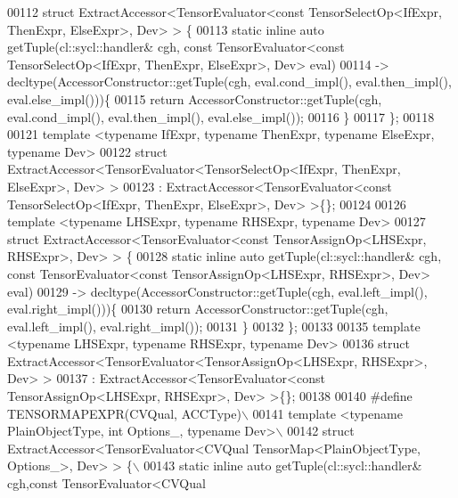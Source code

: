 \begin{DoxyCode}
00112 \textcolor{keyword}{struct }ExtractAccessor<TensorEvaluator<const TensorSelectOp<IfExpr, ThenExpr, ElseExpr>, Dev> > \{
00113   \textcolor{keyword}{static} \textcolor{keyword}{inline} \textcolor{keyword}{auto} getTuple(cl::sycl::handler& cgh, \textcolor{keyword}{const} TensorEvaluator<\textcolor{keyword}{const} TensorSelectOp<IfExpr,
       ThenExpr, ElseExpr>, Dev> eval)
00114   -> decltype(AccessorConstructor::getTuple(cgh, eval.cond\_impl(), eval.then\_impl(), eval.else\_impl()))\{
00115     \textcolor{keywordflow}{return} AccessorConstructor::getTuple(cgh, eval.cond\_impl(), eval.then\_impl(), eval.else\_impl());
00116   \}
00117 \};
00118 
00121 \textcolor{keyword}{template} <\textcolor{keyword}{typename} IfExpr, \textcolor{keyword}{typename} ThenExpr, \textcolor{keyword}{typename} ElseExpr, \textcolor{keyword}{typename} Dev>
00122 \textcolor{keyword}{struct }ExtractAccessor<TensorEvaluator<TensorSelectOp<IfExpr, ThenExpr, ElseExpr>, Dev> >
00123 : ExtractAccessor<TensorEvaluator<const TensorSelectOp<IfExpr, ThenExpr, ElseExpr>, Dev> >\{\};
00124 
00126 \textcolor{keyword}{template} <\textcolor{keyword}{typename} LHSExpr, \textcolor{keyword}{typename} RHSExpr, \textcolor{keyword}{typename} Dev>
00127 \textcolor{keyword}{struct }ExtractAccessor<TensorEvaluator<const TensorAssignOp<LHSExpr, RHSExpr>, Dev> > \{
00128   \textcolor{keyword}{static} \textcolor{keyword}{inline} \textcolor{keyword}{auto} getTuple(cl::sycl::handler& cgh, \textcolor{keyword}{const} TensorEvaluator<\textcolor{keyword}{const} TensorAssignOp<LHSExpr,
       RHSExpr>, Dev> eval)
00129   -> decltype(AccessorConstructor::getTuple(cgh, eval.left\_impl(), eval.right\_impl()))\{
00130     \textcolor{keywordflow}{return} AccessorConstructor::getTuple(cgh, eval.left\_impl(), eval.right\_impl());
00131  \}
00132 \};
00133 
00135 \textcolor{keyword}{template} <\textcolor{keyword}{typename} LHSExpr, \textcolor{keyword}{typename} RHSExpr, \textcolor{keyword}{typename} Dev>
00136 \textcolor{keyword}{struct }ExtractAccessor<TensorEvaluator<TensorAssignOp<LHSExpr, RHSExpr>, Dev> >
00137 : ExtractAccessor<TensorEvaluator<const TensorAssignOp<LHSExpr, RHSExpr>, Dev> >\{\};
00138 
00140 \textcolor{preprocessor}{#define TENSORMAPEXPR(CVQual, ACCType)\(\backslash\)}
00141 \textcolor{preprocessor}{template <typename PlainObjectType, int Options\_, typename Dev>\(\backslash\)}
00142 \textcolor{preprocessor}{struct ExtractAccessor<TensorEvaluator<CVQual TensorMap<PlainObjectType, Options\_>, Dev> > \{\(\backslash\)}
00143 \textcolor{preprocessor}{  static inline auto getTuple(cl::sycl::handler& cgh,const TensorEvaluator<CVQual
}
\end{DoxyCode}
